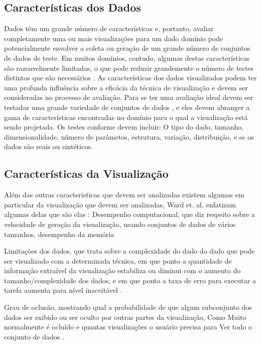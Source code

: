 \subsection{Características dos Dados}

Dados têm um grande número de características e, portanto, avaliar completamente uma ou mais visualizações para um dado domínio pode potencialmente envolver a coleta ou geração de um grande número de conjuntos de dados de teste. Em muitos domínios, contudo, algumas destas características são razoavelmente limitadas, o que pode reduzir grandemente o número de testes distintos que são necessários \cite{ward2015interactive}. As características dos dados visualizados podem ter uma profunda influência sobre a eficácia da técnica de visualização e devem ser consideradas no processo de avaliação. Para se ter uma avaliação ideal devem ser testadas uma grande variedade de conjuntos de dados , e eles devem abranger a gama de características encontradas no domínio para o qual a visualização está sendo projetada. Os testes conforme \cite{ward2015interactive} devem incluir: O tipo do dado, tamanho, dimensionalidade, número de parâmetos, estrutura, variação, distribuição, e se os dados são reais ou sintéticos.


\subsection{Características da Visualização}

Além das outras caracteristicas que devem ser analizadas existem algumas em particular da visualização que devem ser analizadas, Ward et. al. enfatizam algumas delas que são elas \cite{ward2015interactive}: 
Desempenho computacional,  que diz respeito sobre a velocidade de geração da visualização, usando conjuntos de dados de vários tamanhos, desempenho da memória

Limitações dos dados, que trata sobre a complexidade do dado do dado que pode ser visualizado com a determinada técnica, em que ponto a quantidade de informação extraível da visualização estabiliza ou diminui com o aumento do tamanho/complexidade dos dados, e em que ponto a taxa de erro para executar a tarefa aumenta para nível inaceitável \cite{ward2015interactive}. 

Grau de oclusão, mostrando qual a probabilidade de que algum subconjunto dos dados ser exibido ou ser oculto por outras partes da visualização, Como Muito normalmente é ocluído e quantas visualizações o usuário precisa para Ver todo o conjunto de dados \cite{ward2015interactive}.

